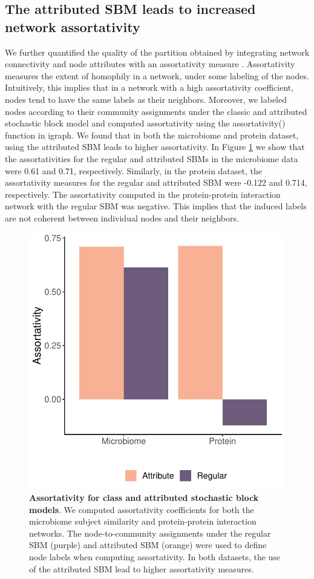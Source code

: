\subsection{The attributed SBM leads to increased network assortativity}

We further quantified the quality of the partition obtained by integrating network connectivity and node attributes with an assortativity measure \cite{assort}. Assortativity measures the extent of homophily in a network, under some labeling of the nodes. Intuitively, this implies that in a network with a high assortativity coefficient, nodes tend to have the same labels as their neighbors. Moreover, we labeled nodes according to their community assignments under the classic and attributed stochastic block model and computed assortativity using the assortativity() function in igraph. We found that in both the microbiome and protein dataset, using the attributed SBM leads to higher assortativity. In Figure \ref{assortFig} we show that the assortativities for the regular and attributed SBMs in the microbiome data were 0.61 and 0.71, respectively. Similarly, in the protein dataset, the assortativity measures for the regular and attributed SBM were -0.122 and 0.714, respectively. The assortativity computed in the protein-protein interaction network with the regular SBM was negative. This implies that the induced labels are not coherent between individual nodes and their neighbors. 

 \begin{figure}[h!]
\begin{center}
\includegraphics[width=.5\textwidth]{assort_fig.pdf}
\caption{{\bf Assortativity for class and attributed stochastic block models}. We computed assortativity coefficients for both the microbiome subject similarity and protein-protein interaction networks. The node-to-community assignments under the regular SBM (purple) and attributed SBM (orange) were used to define node labels when computing assortativity. In both datasets, the use of the attributed SBM lead to higher assortativity measures. }
\label{assortFig}
\end{center}
\end{figure}

